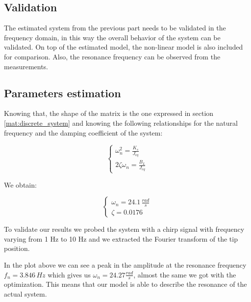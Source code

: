 \subsection{Validation}

The estimated system from the previous part needs to be validated in the frequency domain, in this way the overall behavior of the system can be validated. On top of the estimated model, the non-linear model is also included for comparison. Also, the resonance frequency can be observed from the measurements. 
 
        
        \subsection{Parameters estimation}
        \label{sec: param est}

            Knowing that, the shape of the matrix is the one expressed in section \ref{mat:discrete_system} and knowing the following relationships for the natural frequency and the damping coefficient of the system:

            \begin{equation*}
                \begin{cases}
                    \omega_n^2 = \frac{K_s}{J_{eq}} \\
                    2\zeta\omega_n = \frac{B_L}{J_{eq}}
                \end{cases}
            \end{equation*}

            We obtain:

            \begin{equation*}
                \begin{cases}
                    \omega_n = 24.1 \, \frac{rad}{s} \\
                    \zeta = 0.0176
                \end{cases}
            \end{equation*}

            To validate our results we probed the system with a chirp signal with frequency varying from 1 Hz to 10 Hz and we extracted the Fourier transform of the tip position.


            In the plot above we can see a peak in the amplitude at the resonance frequency $f_n = 3.846 \, Hz$ which gives us $\omega_n = 24.27 \frac{rad}{s}$, almost the same we got with the optimization. This means that our model is able to describe the resonance of the actual system.


